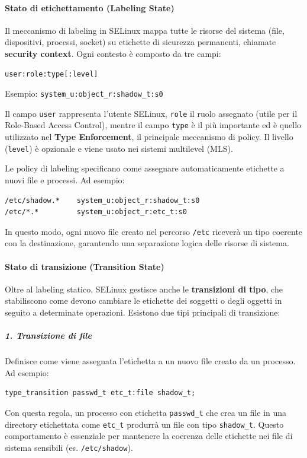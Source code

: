 \paragraph{Stato di etichettamento (Labeling State)}
Il meccanismo di labeling in SELinux mappa tutte le risorse del sistema (file, dispositivi, processi, socket) su etichette di sicurezza permanenti, chiamate \textbf{security context}.
Ogni contesto è composto da tre campi:
\begin{verbatim}
user:role:type[:level]
\end{verbatim}
Esempio:
\texttt{system\_u:object\_r:shadow\_t:s0}

Il campo \texttt{user} rappresenta l’utente SELinux, \texttt{role} il ruolo assegnato (utile per il Role-Based Access Control), mentre il campo \texttt{type} è il più importante ed è quello utilizzato nel \textbf{Type Enforcement}, il principale meccanismo di policy.
Il livello (\texttt{level}) è opzionale e viene usato nei sistemi multilevel (MLS).

Le policy di labeling specificano come assegnare automaticamente etichette a nuovi file e processi.
Ad esempio:
\begin{verbatim}
/etc/shadow.*    system_u:object_r:shadow_t:s0
/etc/*.*         system_u:object_r:etc_t:s0
\end{verbatim}
In questo modo, ogni nuovo file creato nel percorso \texttt{/etc} riceverà un tipo coerente con la destinazione, garantendo una separazione logica delle risorse di sistema.

\paragraph{Stato di transizione (Transition State)}
Oltre al labeling statico, SELinux gestisce anche le \textbf{transizioni di tipo}, che stabiliscono come devono cambiare le etichette dei soggetti o degli oggetti in seguito a determinate operazioni.
Esistono due tipi principali di transizione:

\subparagraph{1. Transizione di file}
Definisce come viene assegnata l’etichetta a un nuovo file creato da un processo.
Ad esempio:
\begin{verbatim}
type_transition passwd_t etc_t:file shadow_t;
\end{verbatim}
Con questa regola, un processo con etichetta \texttt{passwd\_t} che crea un file in una directory etichettata come \texttt{etc\_t} produrrà un file con tipo \texttt{shadow\_t}.
Questo comportamento è essenziale per mantenere la coerenza delle etichette nei file di sistema sensibili (es. \texttt{/etc/shadow}).


